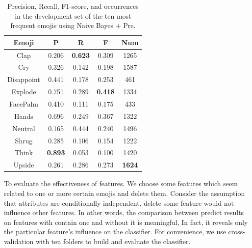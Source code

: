 \documentclass[11pt]{article}
\begin{document}
\begin{table}
	\centering
	\begin{tabular}{c|ccc|c}
		\hline
		\textbf{Emoji} & \textbf{P} & \textbf{R} & \textbf{F} & \textbf{Num} \\
		\hline
		Clap &				0.206  &    \textbf{0.623}   & 0.309 & 1265 \\
		Cry & 				0.326    &  0.142   & 0.198 & 1587 \\
		Disappoint &  0.441    &  0.178   & 0.253 & 461 \\
		Explode & 		0.751    &  0.289   & \textbf{0.418} & 1334 \\
		FacePalm & 		0.410   &   0.111   & 0.175 & 433 \\
		Hands &			 0.696   &   0.249  &  0.367 & 1322 \\
		Neutral & 		0.165     & 0.444    &0.240 & 1496 \\
		Shrug & 		0.285    &  0.106   & 0.154 & 1222 \\
		Think  & 		\textbf{0.893}    &  0.053   & 0.100 & 1420 \\
		Upside & 		0.261    &  0.286  &  0.273& \textbf{1624} \\
		\hline
	\end{tabular}
	\caption{Precision, Recall, F1-score, and occurrences in the development set of the ten most frequent emojis using Naive Bayes + Pre.}
	\label{tab:1}
\end{table}

To evaluate the effectiveness of features. We choose some features which seem related to one or more certain emojis and delete them. Consider the assumption that attributes are conditionally independent, delete some feature would not influence other features. In other words, the comparison between predict results on features with contain one and without it is meaningful, In fact, it reveals only the particular feature's influence on the classifier. For convenience, we use cross-validation with ten folders to build and evaluate the classifier. 
\end{document}
